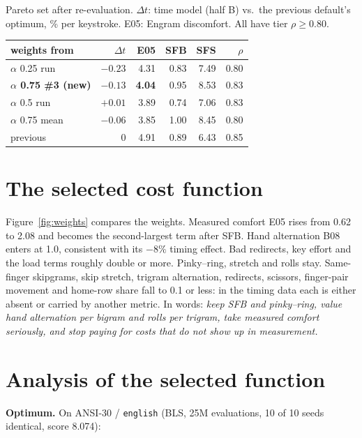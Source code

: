 \documentclass{gecko-paper}
\begin{document}
\begin{paperbody}
\begin{papertable}{Pareto set after re-evaluation. $\Delta t$: time model (half B) vs.\ the previous default's optimum, \% per keystroke. E05: Engram discomfort. All have tier $\rho\ge0.80$.\label{tab:pareto}}
\small\setlength{\tabcolsep}{3pt}
\begin{tabular*}{\linewidth}{@{\extracolsep{\fill}}lrrrrr@{}}
\toprule
weights from & $\Delta t$ & E05 & SFB & SFS & $\rho$\\
\midrule
$\alpha$ 0.25 run & $-0.23$ & 4.31 & 0.83 & 7.49 & 0.80\\
\textbf{$\alpha$ 0.75 \#3 (new)} & $\mathbf{-0.13}$ & \textbf{4.04} & 0.95 & 8.53 & 0.83\\
$\alpha$ 0.5 run & $+0.01$ & 3.89 & 0.74 & 7.06 & 0.83\\
$\alpha$ 0.75 mean & $-0.06$ & 3.85 & 1.00 & 8.45 & 0.80\\
previous & 0 & 4.91 & 0.89 & 6.43 & 0.85\\
\bottomrule
\end{tabular*}
\end{papertable}

\section{The selected cost function}

Figure~\ref{fig:weights} compares the weights. Measured comfort E05 rises from 0.62 to 2.08 and becomes the second-largest term after SFB. Hand alternation B08 enters at 1.0, consistent with its $-8\%$ timing effect. Bad redirects, key effort and the load terms roughly double or more. Pinky–ring, stretch and rolls stay. Same-finger skipgrams, skip stretch, trigram alternation, redirects, scissors, finger-pair movement and home-row share fall to 0.1 or less: in the timing data each is either absent or carried by another metric. In words: \emph{keep SFB and pinky–ring, value hand alternation per bigram and rolls per trigram, take measured comfort seriously, and stop paying for costs that do not show up in measurement.}

\section{Analysis of the selected function}
\textbf{Optimum.} On ANSI-30 / \texttt{english} (BLS, 25M evaluations, 10 of 10 seeds identical, score 8.074):


\end{paperbody}
\end{document}
